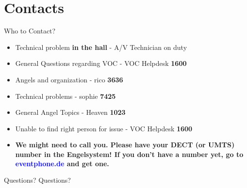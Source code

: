 \documentclass[aspectratio=169]{beamer}
\begin{document}
\section{Contacts}			
\begin{frame}{Who to Contact?}
\begin{itemize}
	\item Technical problem \textbf{in the hall} - A/V Technician on duty
	\item General Questions regarding VOC - VOC Helpdesk \textbf{1600}
	\item Angels and organization - rico \textbf{3636}
	\item Technical problems - sophie \textbf{7425}
	\item General Angel Topics - Heaven \textbf{1023}
	\item Unable to find right person for issue - VOC Helpdesk \textbf{1600}
	\item \textbf{We might need to call you. Please have your DECT (or UMTS) number in the Engelsystem! If you don't have a number yet, go to 
	\textcolor{blue}{\textbf{eventphone.de}} and get one.} 
\end{itemize} 
\end{frame}

\begin{frame}{Questions?}
Questions?
\end{frame}
\end{document}
